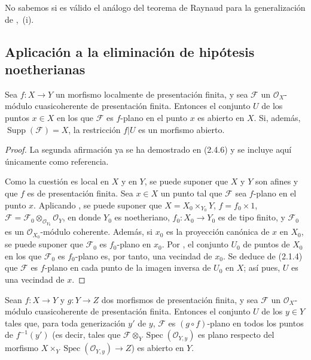 \begin{remark}[11.2.10]
\label{IV.11.2.10}
No sabemos si es válido el análogo del teorema de Raynaud para la
generalización de ,~(i).
\end{remark}

\subsection{Aplicación a la eliminación de hipótesis noetherianas}
\label{subsection:IV.11.3}
\label{IV.11.3}



\begin{theorem}[11.3.1]
\label{IV.11.3.1}
Sea $f:X\to Y$ un morfismo localmente de
presentación finita, y sea $\mathcal F$ un $\mathcal O_X$-módulo
cuasicoherente de presentación finita. Entonces el conjunto
$U$ de los puntos $x\in X$ en los que $\mathcal F$ es
$f$-plano en el punto $x$ es abierto en $X$. Si, además,
$\operatorname{Supp}(\mathcal F)=X$, la restricción
$f|U$ es un morfismo abierto.
\end{theorem}

\begin{proof}
La segunda afirmación ya se ha demostrado en (2.4.6) y se incluye
aquí únicamente como referencia.

Como la cuestión es local en $X$ y en $Y$, se puede suponer que $X$ y $Y$ son afines y que $f$ es de presentación finita. Sea
$x\in X$ un punto tal que $\mathcal F$ sea $f$-plano en el punto $x$. Aplicando
, se puede suponer que
$X=X_0\times_{Y_0}Y$, $f=f_0\times1$,
$\mathcal F=\mathcal F_0\otimes_{\mathcal O_{Y_0}}\mathcal O_Y$,
en donde $Y_0$ es noetheriano,
$f_0:X_0\to Y_0$ es de tipo finito, y
$\mathcal F_0$ es un $\mathcal O_{X_0}$-módulo coherente. Además, si
$x_0$ es la proyección canónica de $x$ en $X_0$, se puede suponer que $\mathcal F_0$ es $f_0$-plano en $x_0$. Por
, el conjunto $U_0$ de puntos de
$X_0$ en los que $\mathcal F_0$ es $f_0$-plano es, por tanto, una
vecindad de $x_0$. Se deduce de (2.1.4) que $\mathcal F$ es
$f$-plano en cada punto de la imagen inversa de $U_0$ en
$X$; así pues, $U$ es una vecindad de $x$.
\end{proof}


\begin{corollary}[11.3.2]
\label{IV.11.3.2}
Sean $f:X\to Y$ y $g:Y\to Z$ dos morfismos de presentación finita, y sea $\mathcal F$ un $\mathcal O_X$-módulo cuasicoherente de presentación finita. Entonces el conjunto $U$ de los $y\in Y$ tales que, para toda generización $y'$ de $y$, $\mathcal F$ es $(g\circ f)$-plano en todos los puntos de $f^{-1}(y')$ \textup{(es decir,} tales que $\mathcal F\otimes_Y\operatorname{Spec}(\mathcal O_{Y,y})$ es plano respecto del morfismo $X\times_Y\operatorname{Spec}(\mathcal O_{Y,y})\to Z$\textup{)} es abierto en $Y$.
\end{corollary}

